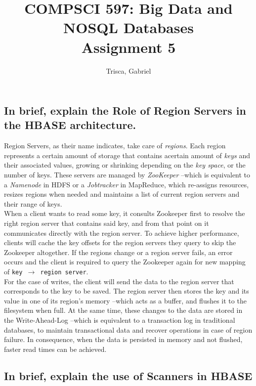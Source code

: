 \documentclass[a4paper,10pt]{article}
\title{{\large{COMPSCI 597: Big Data and NOSQL Databases}}\\Assignment 5}
\author{Trisca, Gabriel}
\begin{document}
\maketitle

\subsection*{In brief, explain the Role of Region Servers in the HBASE architecture.}

Region Servers, as their name indicates, take care of \textit{regions}. Each region represents a certain amount of storage that contains acertain amount of \textit{keys} and their associated values, growing or shrinking depending on the \textit{key space}, or the number of keys. These servers are managed by \textit{ZooKeeper} --which is equivalent to a \textit{Namenode} in HDFS or a \textit{Jobtracker} in MapReduce, which re-assigns resources, resizes regions when needed and maintains a list of current region servers and their range of keys.\\

When a client wants to read some key, it consults Zookeeper first to resolve the right region server that contains said key, and from that point on it communicates directly with the region server. To achieve higher performance, clients will cache the key offsets for the region servers they query to skip the Zookeeper altogether. If the regions change or a region server fails, an error occurs and the client is required to query the Zookeeper again for new mapping of \texttt{key $\rightarrow$ region server}.\\

For the case of writes, the client will send the data to the region server that corresponds to the key to be saved. The region server then stores the key and its value in one of its region's memory --which acts as a buffer, and flushes it to the filesystem when full. At the same time, these changes to the data are stored in the Write-Ahead-Log --which is equivalent to a transaction log in traditional databases, to maintain transactional data and recover operations in case of region failure. In consequence, when the data is persisted in memory and not flushed, faster read times can be achieved.

\subsection*{In brief, explain the use of Scanners in HBASE}
\end{document}
